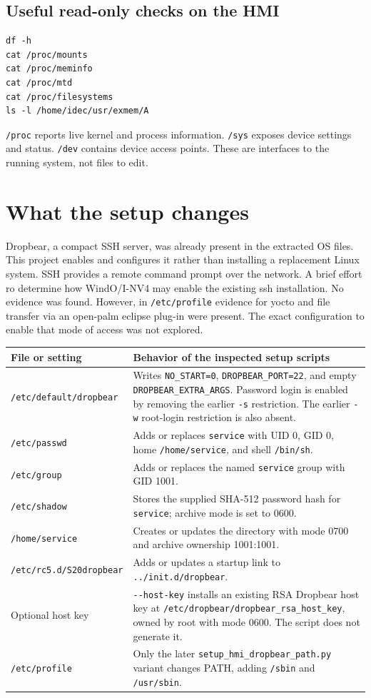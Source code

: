 \documentclass[10pt,letterpaper]{article}
\newcommand{\file}[1]{\nolinkurl{#1}}
\begin{document}
\subsection{Useful read-only checks on the HMI}
\begin{lstlisting}
df -h
cat /proc/mounts
cat /proc/meminfo
cat /proc/mtd
cat /proc/filesystems
ls -l /home/idec/usr/exmem/A
\end{lstlisting}
\file{/proc} reports live kernel and process information. \file{/sys} exposes
device settings and status. \file{/dev} contains device access points. These
are interfaces to the running system, not files to edit.

\newpage
\section{What the setup changes}\label{setup}
Dropbear, a compact SSH server, was already present in the extracted OS files. This project
enables and configures it rather than installing a replacement Linux system.
SSH provides a remote command prompt over the network. A brief effort ro determine how WindO/I-NV4
may enable the existing ssh installation. No evidence was found. However, in \file{/etc/profile}
evidence for yocto and file transfer via an open-palm eclipse plug-in were present. The exact configuration
to enable that mode of access was not explored. \\

\begin{tabularx}{\linewidth}{@{}p{1.95in}Y@{}}
\toprule
File or setting & Behavior of the inspected setup scripts \\
\midrule
\file{/etc/default/dropbear} & Writes \file{NO_START=0}, \file{DROPBEAR_PORT=22}, and empty \file{DROPBEAR_EXTRA_ARGS}. Password login is enabled by removing the earlier \file{-s} restriction. The earlier \file{-w} root-login restriction is also absent. \\
\file{/etc/passwd} & Adds or replaces \file{service} with UID 0, GID 0, home \file{/home/service}, and shell \file{/bin/sh}. \\
\file{/etc/group} & Adds or replaces the named \file{service} group with GID 1001. \\
\file{/etc/shadow} & Stores the supplied SHA-512 password hash for \file{service}; archive mode is set to 0600. \\
\file{/home/service} & Creates or updates the directory with mode 0700 and archive ownership 1001:1001. \\
\file{/etc/rc5.d/S20dropbear} & Adds or updates a startup link to \file{../init.d/dropbear}. \\
Optional host key & \file{--host-key} installs an existing RSA Dropbear host key at \file{/etc/dropbear/dropbear_rsa_host_key}, owned by root with mode 0600. The script does not generate it. \\
\file{/etc/profile} & Only the later \file{setup_hmi_dropbear_path.py} variant changes PATH, adding \file{/sbin} and \file{/usr/sbin}. \\
\bottomrule
\end{tabularx}
\end{document}
